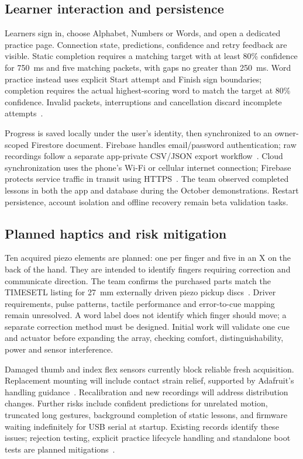 \documentclass[11pt,letterpaper]{article}
\begin{document}
\subsection{Learner interaction and persistence}
Learners sign in, choose Alphabet, Numbers or Words, and open a dedicated
practice page. Connection state, predictions, confidence and retry feedback
are visible. Static completion requires a matching target with at least 80\%
confidence for 750~ms and five matching packets, with gaps no greater than
250~ms. Word practice instead uses explicit Start attempt and Finish sign
boundaries; completion requires the actual highest-scoring word to match the
target at 80\% confidence. Invalid packets, interruptions and cancellation
discard incomplete attempts~\cite{integration}.

Progress is saved locally under the user's identity, then synchronized to an
owner-scoped Firestore document. Firebase handles email/password authentication;
raw recordings follow a separate app-private CSV/JSON export workflow~\cite{auth,firestore}.
Cloud synchronization uses the phone's Wi-Fi or cellular internet connection;
Firebase protects service traffic in transit using HTTPS~\cite{cloudsecurity}.
The team observed completed lessons in both the app and database during the
October demonstrations. Restart persistence, account isolation and offline
recovery remain beta validation tasks.

\subsection{Planned haptics and risk mitigation}
Ten acquired piezo elements are planned: one per finger and five in an X on
the back of the hand. They are intended to identify fingers requiring correction
and communicate direction. The team confirms the purchased parts match the
TIMESETL listing for 27~mm externally driven piezo pickup discs~\cite{piezo}.
Driver requirements, pulse patterns,
tactile performance and error-to-cue mapping remain unresolved. A word label does not identify
which finger should move; a separate correction method must be designed.
Initial work will validate one cue and actuator before expanding the array,
checking comfort, distinguishability, power and sensor interference.

Damaged thumb and index flex sensors currently block reliable fresh acquisition. Replacement
mounting will include contact strain relief, supported by Adafruit's handling
guidance~\cite{flex}. Recalibration and new recordings will address distribution
changes. Further risks include confident predictions for unrelated motion,
truncated long gestures, background completion of static lessons, and firmware
waiting indefinitely for USB serial at startup. Existing records identify these
issues; rejection testing, explicit practice lifecycle handling and standalone
boot tests are planned mitigations~\cite{repo}.
\end{document}

